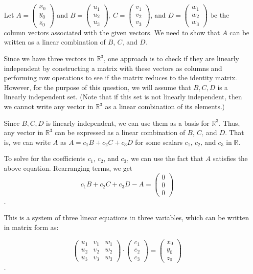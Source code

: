 \documentclass[fontsize=12pt]{scrartcl}
\begin{document}
\noindent
Let $A = \left(\begin{array}{c} x_0 \\ y_0 \\ z_0 \end{array}\right)$ and $B = \left(\begin{array}{c} u_1 \\ u_2 \\ u_3 \end{array}\right)$, $C = \left(\begin{array}{c} v_1 \\ v_2 \\ v_3 \end{array}\right)$, and $D = \left(\begin{array}{c} w_1 \\ w_2 \\ w_3 \end{array}\right)$ be the column vectors associated with the given vectors. We need to show that $A$ can be written as a linear combination of $B$, $C$, and $D$.

\noindent
Since we have three vectors in $\mathbb{R}^3$, one approach is to check if they are linearly independent by constructing a matrix with these vectors as columns and performing row operations to see if the matrix reduces to the identity matrix. However, for the purpose of this question, we will assume that ${B, C, D}$ is a linearly independent set. (Note that if this set is not linearly independent, then we cannot write any vector in $\mathbb{R}^3$ as a linear combination of its elements.)

\noindent
Since ${B, C, D}$ is linearly independent, we can use them as a basis for $\mathbb{R}^3$. Thus, any vector in $\mathbb{R}^3$ can be expressed as a linear combination of $B$, $C$, and $D$. That is, we can write $A$ as $A = c_1B + c_2C + c_3D$ for some scalars $c_1$, $c_2$, and $c_3$ in $\mathbb{R}$.

\noindent
To solve for the coefficients $c_1$, $c_2$, and $c_3$, we can use the fact that $A$ satisfies the above equation. Rearranging terms, we get $$c_1B + c_2C + c_3D - A = \left(\begin{array}{c} 0 \\ 0 \\ 0 \end{array}\right)$$. 

\noindent
This is a system of three linear equations in three variables, which can be written in matrix form as:

$$\left(\begin{array}{ccc} u_1 & v_1 & w_1 \\ u_2 & v_2 & w_2\\ u_3 & v_3 & w_3 \end{array}\right) \cdot \left(\begin{array}{c} c_1 \\ c_2 \\ c_3 \end{array}\right) = \left(\begin{array}{c} x_0 \\ y_0 \\ z_0 \end{array}\right)$$.
\end{document}

